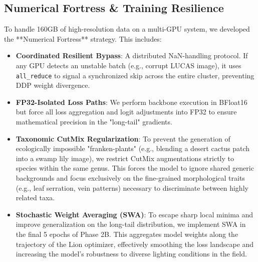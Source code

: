 \documentclass[10pt,twocolumn,letterpaper]{article}
\begin{document}
\subsection{Numerical Fortress \& Training Resilience}
To handle 160GB of high-resolution data on a multi-GPU system, we developed the **Numerical Fortress** strategy. This includes:
\begin{itemize}
    \item \textbf{Coordinated Resilient Bypass}: A distributed NaN-handling protocol. If any GPU detects an unstable batch (e.g., corrupt LUCAS image), it uses \texttt{all\_reduce} to signal a synchronized skip across the entire cluster, preventing DDP weight divergence.
    \item \textbf{FP32-Isolated Loss Paths}: We perform backbone execution in BFloat16 but force all loss aggregation and logit adjustments into FP32 to ensure mathematical precision in the "long-tail" gradients.
    \item \textbf{Taxonomic CutMix Regularization}: To prevent the generation of ecologically impossible "franken-plants" (e.g., blending a desert cactus patch into a swamp lily image), we restrict CutMix augmentations strictly to species within the same genus. This forces the model to ignore shared generic backgrounds and focus exclusively on the fine-grained morphological traits (e.g., leaf serration, vein patterns) necessary to discriminate between highly related taxa.
    \item \textbf{Stochastic Weight Averaging (SWA)}: To escape sharp local minima and improve generalization on the long-tail distribution, we implement SWA in the final 5 epochs of Phase 2B. This aggregates model weights along the trajectory of the Lion optimizer, effectively smoothing the loss landscape and increasing the model's robustness to diverse lighting conditions in the field.
\end{itemize}
\end{document}
